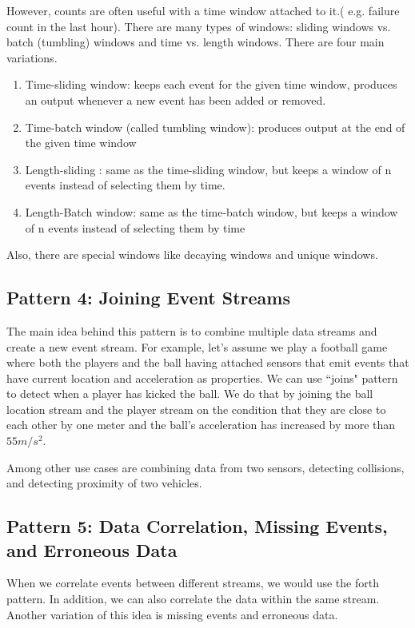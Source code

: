 \documentclass{sig-alternate}
\begin{document}
However, counts are often useful with a time window attached to it.( e.g. failure count in the last hour). There are many types of windows: sliding windows vs. batch (tumbling) windows and time vs. length windows. There are four main variations. 

\begin{enumerate}
\item Time-sliding window: keeps each event for the given time window, produces an output whenever a new event has been added or removed. 
\item Time-batch window (called tumbling window): produces output at the end of the given time window
\item Length-sliding : same as the time-sliding window, but keeps a window of n events instead of selecting them by time.
\item Length-Batch window: same as the time-batch window, but keeps a window of n events instead of selecting them by time
\end{enumerate}

Also, there are special windows like decaying windows and unique windows. 


\subsection{Pattern 4: Joining Event Streams}
The main idea behind this pattern is to combine multiple data streams and create a new event stream. For example, let's assume we play a football game where both the players and the ball having attached sensors that emit events that have current location and acceleration as properties. We can use ``joins" pattern to detect when a player has kicked the ball. We do that by joining the ball location stream and the player stream on the condition that they are close to each other by one meter and the ball's acceleration has increased by more than $55m/s^2$.

Among other use cases are combining data from two sensors, detecting collisions, and detecting proximity of two vehicles. 

\subsection{Pattern 5: Data Correlation, Missing Events, and Erroneous Data}

When we correlate events between different streams, we would use the forth pattern. In addition, we can also correlate the data within the same stream. Another variation of this idea is missing events and erroneous data. 
\end{document}
